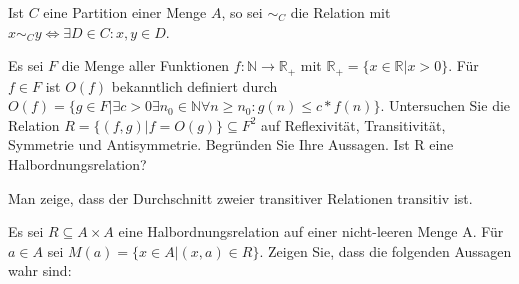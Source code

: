 \documentclass[10pt, a4paper]{exam}
\begin{document}
\begin{questions}

    \question Ist $C$ eine Partition einer Menge $A$, so sei $\sim_C$ die Relation mit $x\sim_C y\Leftrightarrow\exists D\in C: x, y\in D$.

    \question Es sei $F$ die Menge aller Funktionen $f:\mathbb{N}\rightarrow\mathbb{R}_{+}$ mit $\mathbb{R}_{+} = \{x\in\mathbb{R} | x > 0\}$.
    Für $f\in F$ ist $O(f)$ bekanntlich definiert durch $O(f)=\{g\in F | \exists c > 0 \exists n_0\in \mathbb{N}\forall n \geq n_0: g(n) \leq c * f(n)\}$.
    Untersuchen Sie die Relation $R=\{(f,g)|f= O(g)\} \subseteq F^2$ auf Reflexivität, Transitivität, Symmetrie und Antisymmetrie. Begründen Sie Ihre Aussagen. Ist R eine Halbordnungsrelation?

    \question Man zeige, dass der Durchschnitt zweier transitiver Relationen transitiv ist.

    \question Es sei $R\subseteq A\times A$ eine Halbordnungsrelation auf einer nicht-leeren Menge A. Für $a\in A$ sei $M(a)=\{x\in A |(x, a)\in R\}$. Zeigen Sie, dass die folgenden Aussagen wahr sind:


\end{questions}
\end{document}
